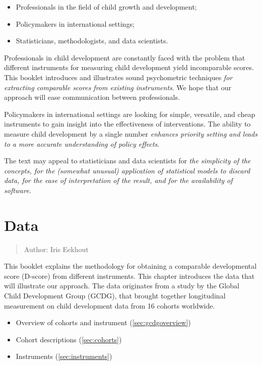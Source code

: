 \documentclass[
]{book}
\providecommand{\tightlist}{%
  \setlength{\itemsep}{0pt}\setlength{\parskip}{0pt}}
\begin{document}
\begin{itemize}
\tightlist
\item
  Professionals in the field of child growth and development;
\item
  Policymakers in international settings;
\item
  Statisticians, methodologists, and data scientists.
\end{itemize}

Professionals in child development are constantly faced with the problem that different instruments for measuring child development yield incomparable scores. This booklet introduces and illustrates sound psychometric techniques \emph{for extracting comparable scores from existing instruments}. We hope that our approach will ease communication between professionals.

Policymakers in international settings are looking for simple, versatile, and cheap instruments to gain insight into the effectiveness of interventions. The ability to measure child development by a single number \emph{enhances priority setting and leads to a more accurate understanding of policy effects}.

The text may appeal to statisticians and data scientists for \emph{the simplicity of the concepts, for the (somewhat unusual) application of statistical models to discard data, for the ease of interpretation of the result, and for the availability of software}.

\hypertarget{ch:data}{%
\chapter{Data}\label{ch:data}}

\begin{quote}
Author: Iris Eekhout
\end{quote}

This booklet explains the methodology for obtaining a comparable developmental score (D-score) from different instruments. This chapter introduces the data that will illustrate our approach. The data originates from a study by the Global Child Development Group (GCDG), that brought together longitudinal measurement on child development data from 16 cohorts worldwide.

\begin{itemize}
\tightlist
\item
  Overview of cohorts and instrument (\ref{sec:gcdgoverview})
\item
  Cohort descriptions (\ref{sec:cohorts})
\item
  Instruments (\ref{sec:instruments})
\end{itemize}
\end{document}
